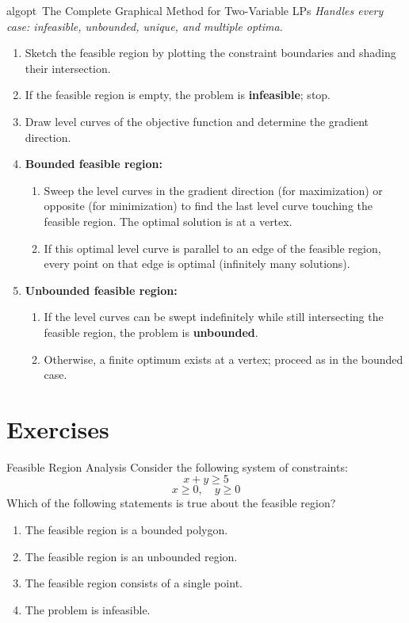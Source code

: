 \begin{stepbox}{algopt}{\ The Complete Graphical Method for Two-Variable LPs}
\emph{Handles every case: infeasible, unbounded, unique, and multiple optima.}
\begin{enumerate}
    \item Sketch the feasible region by plotting the constraint boundaries and shading their intersection.
    \item If the feasible region is empty, the problem is \textbf{infeasible}; stop.
    \item Draw level curves of the objective function and determine the gradient direction.
    \item \textbf{Bounded feasible region:}
    \begin{enumerate}
        \item Sweep the level curves in the gradient direction (for maximization) or opposite (for minimization) to find the last level curve touching the feasible region. The optimal solution is at a vertex.
        \item If this optimal level curve is parallel to an edge of the feasible region, every point on that edge is optimal (infinitely many solutions).
    \end{enumerate}
    \item \textbf{Unbounded feasible region:}
    \begin{enumerate}
        \item If the level curves can be swept indefinitely while still intersecting the feasible region, the problem is \textbf{unbounded}.
        \item Otherwise, a finite optimum exists at a vertex; proceed as in the bounded case.
    \end{enumerate}
\end{enumerate}
\end{stepbox}

\newpage

\section{Exercises}\label{exercises}


\begin{ex}{Feasible Region Analysis}{}
Consider the following system of constraints:
\[
x + y \geq 5
\]
\[
x \geq 0, \quad y \geq 0
\]
Which of the following statements is true about the feasible region?
\begin{enumerate}
    \item  The feasible region is a bounded polygon.
    \item The feasible region is an unbounded region.
    \item The feasible region consists of a single point.
    \item The problem is infeasible.
\end{enumerate}
\exrefs{\S\ref{sec:nonempty-bounded}, \S\ref{sec:unbounded-regions}}
\end{ex}

